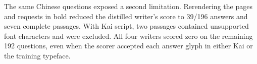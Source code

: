 The same Chinese questions exposed a second limitation. Rerendering the pages and requests in bold reduced the distilled writer's score to 39/196 answers and seven complete passages. With Kai script, two passages contained unsupported font characters and were excluded. All four writers scored zero on the remaining 192 questions, even when the scorer accepted each answer glyph in either Kai or the training typeface.

